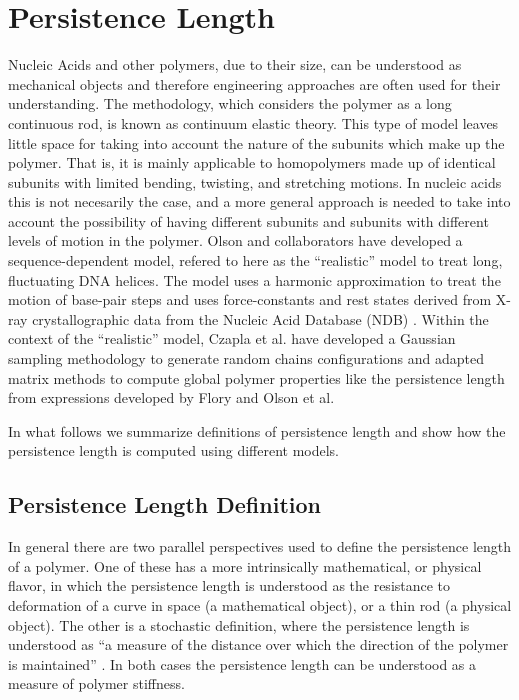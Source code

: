 \chapter{Persistence Length}
\label{appendix4a}
 Nucleic Acids and other polymers, due to their
size,  can  be   understood  as  mechanical  objects  \cite{marko2003,
  nelson2004} and therefore engineering  approaches are often used for
their understanding.  The methodology,  which considers the polymer as
a long  continuous rod,  is known as  continuum elastic  theory.  This
type of model  leaves little space for taking  into account the nature
of  the subunits  which make  up the  polymer. That  is, it  is mainly
applicable to homopolymers made  up of identical subunits with limited
bending, twisting,  and stretching motions.  In nucleic acids  this is
not necesarily the case, and a more general approach is needed to take
into account the possibility of having different subunits and subunits
with  different   levels  of  motion   in  the  polymer.    Olson  and
collaborators  have developed a  sequence-dependent model,  refered to
here  as  the  ``realistic''  model \cite{olson1993}  to  treat  long,
fluctuating DNA  helices.  The model uses a  harmonic approximation to
treat the motion of base-pair  steps and uses force-constants and rest
states derived from X-ray  crystallographic data from the Nucleic Acid
Database (NDB)  \cite{go1976, olson1998}.   Within the context  of the
``realistic'' model, Czapla et al.  \cite{czapla2006} have developed a
Gaussian sampling methodology to generate random chains configurations
and adapted  matrix methods to compute global  polymer properties like
the   persistence   length  from   expressions   developed  by   Flory
\cite{flory1969} and Olson et al. \cite{maroun1988a, marky1994a}

In  what follows we  summarize definitions  of persistence  length and
show how the persistence length is computed using different models.

\section{Persistence Length Definition}
In  general there  are two  parallel perspectives  used to  define the
persistence length of a polymer. One of these has a more intrinsically
mathematical, or  physical flavor, in which the  persistence length is
understood as  the resistance  to deformation of  a curve in  space (a
mathematical object), or a thin rod (a physical object).  The other is
a stochastic definition, where the persistence length is understood as
``a measure of the distance over which the direction of the polymer is
maintained'' \cite{kratky1949}.  In  both cases the persistence length
can be understood as a measure of polymer stiffness.

